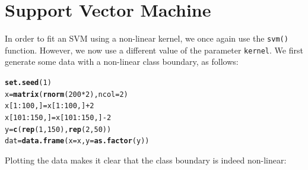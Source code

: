 \documentclass[12pt]{article}\usepackage[]{graphicx}\usepackage[]{color}
\makeatletter
\newcommand{\hlnum}[1]{\textcolor[rgb]{0.686,0.059,0.569}{#1}}%
\newcommand{\hlopt}[1]{\textcolor[rgb]{0,0,0}{#1}}%
\newcommand{\hlstd}[1]{\textcolor[rgb]{0.345,0.345,0.345}{#1}}%
\newcommand{\hlkwb}[1]{\textcolor[rgb]{0.69,0.353,0.396}{#1}}%
\newcommand{\hlkwc}[1]{\textcolor[rgb]{0.333,0.667,0.333}{#1}}%
\newcommand{\hlkwd}[1]{\textcolor[rgb]{0.737,0.353,0.396}{\textbf{#1}}}%
\newenvironment{kframe}{%
 \def\at@end@of@kframe{}%
 \ifinner\ifhmode%
  \def\at@end@of@kframe{\end{minipage}}%
  \begin{minipage}{\columnwidth}%
 \fi\fi%
 \def\FrameCommand##1{\hskip\@totalleftmargin \hskip-\fboxsep
 \colorbox{shadecolor}{##1}\hskip-\fboxsep
     \hskip-\linewidth \hskip-\@totalleftmargin \hskip\columnwidth}%
 \MakeFramed {\advance\hsize-\width
   \@totalleftmargin\z@ \linewidth\hsize
   \@setminipage}}%
 {\par\unskip\endMakeFramed%
 \at@end@of@kframe}
\newenvironment{knitrout}{}{} %
\makeatother
\begin{document}
\newpage
\section{Support Vector Machine}

In order to fit an SVM using a non-linear kernel, we once again use the \texttt{svm()} function. However, we now use a different value of the parameter \texttt{kernel}. We first generate some data with a non-linear class boundary, as follows:

\begin{knitrout}
\color{fgcolor}\begin{kframe}
\begin{alltt}
\hlkwd{set.seed}\hlstd{(}\hlnum{1}\hlstd{)}
\hlstd{x}\hlkwb{=}\hlkwd{matrix}\hlstd{(}\hlkwd{rnorm}\hlstd{(}\hlnum{200}\hlopt{*}\hlnum{2}\hlstd{),} \hlkwc{ncol}\hlstd{=}\hlnum{2}\hlstd{)}
\hlstd{x[}\hlnum{1}\hlopt{:}\hlnum{100}\hlstd{,]}\hlkwb{=}\hlstd{x[}\hlnum{1}\hlopt{:}\hlnum{100}\hlstd{,]}\hlopt{+}\hlnum{2}
\hlstd{x[}\hlnum{101}\hlopt{:}\hlnum{150}\hlstd{,]}\hlkwb{=}\hlstd{x[}\hlnum{101}\hlopt{:}\hlnum{150}\hlstd{,]}\hlopt{-}\hlnum{2}
\hlstd{y}\hlkwb{=}\hlkwd{c}\hlstd{(}\hlkwd{rep}\hlstd{(}\hlnum{1}\hlstd{,}\hlnum{150}\hlstd{),}\hlkwd{rep}\hlstd{(}\hlnum{2}\hlstd{,}\hlnum{50}\hlstd{))}
\hlstd{dat}\hlkwb{=}\hlkwd{data.frame}\hlstd{(}\hlkwc{x}\hlstd{=x,} \hlkwc{y}\hlstd{=}\hlkwd{as.factor}\hlstd{(y))}
\end{alltt}
\end{kframe}
\end{knitrout}

Plotting the data makes it clear that the class boundary is indeed non-linear:
\end{document}

